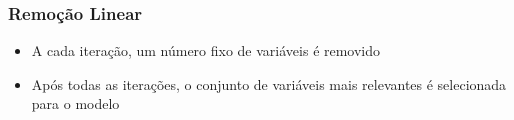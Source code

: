 \begin{frame}
\frametitle{Remoção Linear}
\begin{itemize}
    \item A cada iteração, um número fixo de variáveis é removido
    \item Após todas as iterações, o conjunto de variáveis mais relevantes é selecionada para o modelo
\end{itemize}
\end{frame}

